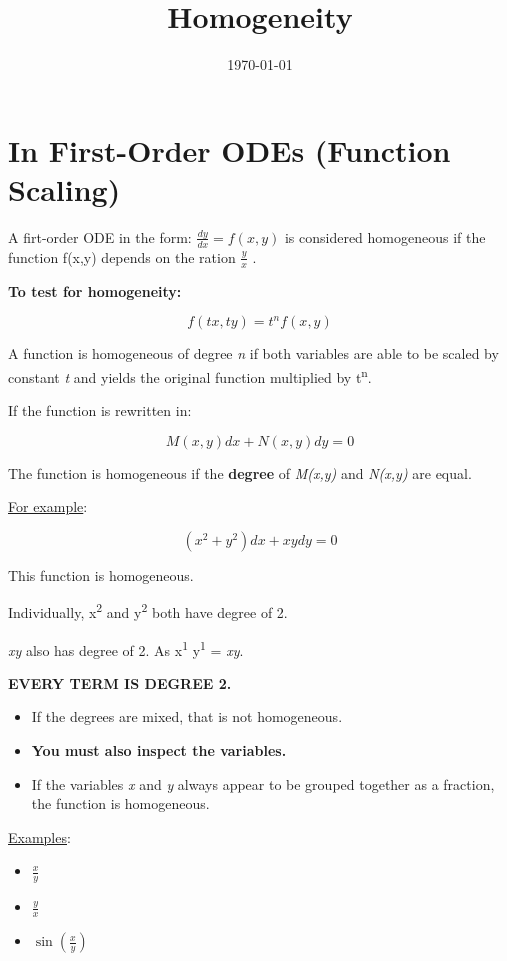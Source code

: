 \documentclass[11pt]{article}
\date{\today}
\title{Homogeneity}
\begin{document}
\maketitle
\tableofcontents

\section{In First-Order ODEs (Function Scaling)}
\label{sec:org236f0f9}

A firt-order ODE in the form: \(\frac{dy}{dx} = f(x,y)\) is considered homogeneous if the function f(x,y) depends on the ration \(\frac{y}{x}\) .

\textbf{To test for homogeneity:}

$$f(tx, ty) = t^{n} f(x,y)$$

A function is homogeneous of degree \emph{n} if both variables are able to be scaled by constant \emph{t} and yields the original function multiplied by t\textsuperscript{n}.

If the function is rewritten in:

$$M(x,y)dx + N(x,y)dy = 0$$

The function is homogeneous if the \textbf{degree} of \emph{M(x,y)} and \emph{N(x,y)} are equal.

\uline{For example}:

$$(x^{2} + y^{2})dx + xydy = 0$$

This function is homogeneous.

Individually, x\textsuperscript{2} and y\textsuperscript{2} both have degree of 2.

\emph{xy} also has degree of 2. As x\textsuperscript{1} \texttimes{} y\textsuperscript{1} = \emph{xy}.

\textbf{EVERY TERM IS DEGREE 2.}

\begin{itemize}
\item If the degrees are mixed, that is not homogeneous.

\item \textbf{You must also inspect the variables.}

\item If the variables \emph{x} and \emph{y} always appear to be grouped together as a fraction, the function is homogeneous.
\end{itemize}


\uline{Examples}:

\begin{itemize}
\item \(\frac{x}{y}\)

\item \(\frac{y}{x}\)

\item \(\sin\left(\frac{x}{y}\right)\)
\end{itemize}
\end{document}
